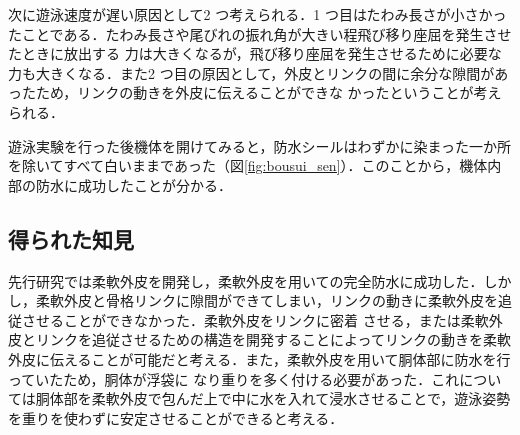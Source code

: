 次に遊泳速度が遅い原因として2 つ考えられる．1 つ目はたわみ長さが小さかったことである．たわみ長さや尾びれの振れ角が大きい程飛び移り座屈を発生させたときに放出する
力は大きくなるが，飛び移り座屈を発生させるために必要な力も大きくなる．また2 つ目の原因として，外皮とリンクの間に余分な隙間があったため，リンクの動きを外皮に伝えることができな
かったということが考えられる．

遊泳実験を行った後機体を開けてみると，防水シールはわずかに染まった一か所を除いてすべて白いままであった（図\ref{fig:bousui_sen}）．このことから，機体内部の防水に成功したことが分かる．

\subsection{得られた知見}
先行研究では柔軟外皮を開発し，柔軟外皮を用いての完全防水に成功した．しかし，柔軟外皮と骨格リンクに隙間ができてしまい，リンクの動きに柔軟外皮を追従させることができなかった．柔軟外皮をリンクに密着
させる，または柔軟外皮とリンクを追従させるための構造を開発することによってリンクの動きを柔軟外皮に伝えることが可能だと考える．また，柔軟外皮を用いて胴体部に防水を行っていたため，胴体が浮袋に
なり重りを多く付ける必要があった．これについては胴体部を柔軟外皮で包んだ上で中に水を入れて浸水させることで，遊泳姿勢を重りを使わずに安定させることができると考える．